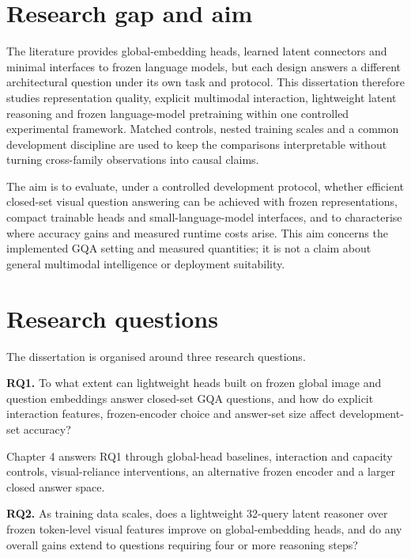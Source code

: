 \section{Research gap and aim}
\label{sec:ch1-gap}

The literature provides global-embedding heads, learned latent connectors and
minimal interfaces to frozen language models, but each design answers a
different architectural question under its own task and protocol. This
dissertation therefore studies representation quality, explicit multimodal
interaction, lightweight latent reasoning and frozen language-model
pretraining within one controlled experimental framework. Matched controls,
nested training scales and a common development discipline are used to keep
the comparisons interpretable without turning cross-family observations into
causal claims.

The aim is to evaluate, under a controlled development protocol, whether
efficient closed-set visual question answering can be achieved with frozen
representations, compact trainable heads and small-language-model interfaces,
and to characterise where accuracy gains and measured runtime costs arise.
This aim concerns the implemented GQA setting and measured quantities; it is
not a claim about general multimodal intelligence or deployment suitability.

\section{Research questions}
\label{sec:ch1-rqs}

The dissertation is organised around three research questions.

\label{rq:rq1}
\noindent\textbf{RQ1.} To what extent can lightweight heads built on frozen global image and question embeddings answer closed-set GQA questions, and how do explicit interaction features, frozen-encoder choice and answer-set size affect development-set accuracy?

Chapter 4 answers RQ1 through global-head baselines, interaction and capacity
controls, visual-reliance interventions, an alternative frozen encoder and a
larger closed answer space.

\label{rq:rq2}
\noindent\textbf{RQ2.} As training data scales, does a lightweight 32-query latent reasoner over frozen token-level visual features improve on global-embedding heads, and do any overall gains extend to questions requiring four or more reasoning steps?

